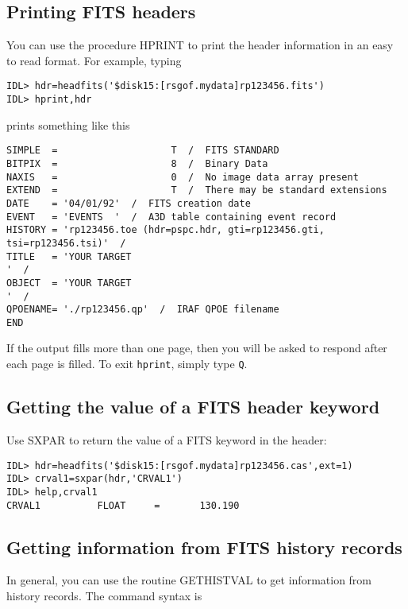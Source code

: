 \subsection{Printing FITS headers}
 
You can use the procedure HPRINT to print the header information in an easy to
read format. For example, typing

\medskip\noindent
\begin{verbatim}
IDL> hdr=headfits('$disk15:[rsgof.mydata]rp123456.fits')
IDL> hprint,hdr
\end{verbatim}
prints something like this

\medskip\noindent
\begin{verbatim}
SIMPLE  =                    T  /  FITS STANDARD
BITPIX  =                    8  /  Binary Data
NAXIS   =                    0  /  No image data array present
EXTEND  =                    T  /  There may be standard extensions
DATE    = '04/01/92'  /  FITS creation date
EVENT   = 'EVENTS  '  /  A3D table containing event record
HISTORY = 'rp123456.toe (hdr=pspc.hdr, gti=rp123456.gti, tsi=rp123456.tsi)'  /
TITLE   = 'YOUR TARGET                                                     '  /
OBJECT  = 'YOUR TARGET                                                     '  /
QPOENAME= './rp123456.qp'  /  IRAF QPOE filename
END
\end{verbatim}
If the output fills more than one page, then you will be asked to respond
after each page is filled. To exit {\tt hprint}, simply type {\tt Q}.
 

\subsection{Getting the value of a FITS header keyword}
 
Use SXPAR to return the value of a FITS keyword in the header:

\medskip\noindent
\begin{verbatim}
IDL> hdr=headfits('$disk15:[rsgof.mydata]rp123456.cas',ext=1)
IDL> crval1=sxpar(hdr,'CRVAL1')
IDL> help,crval1
CRVAL1          FLOAT     =       130.190
\end{verbatim}
 

\subsection{Getting information from FITS history records}
 
In general, you can use the routine GETHISTVAL to get information from history
records. The command syntax is

